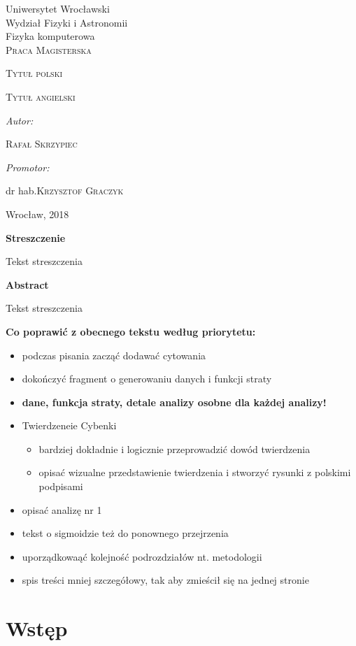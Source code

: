 \documentclass[11pt]{book}
\title{}
\author{Rafał Skrzypiec}
\makeatletter
\theoremstyle{definition}
\newcommand\blankpage{%
	\null
	\thispagestyle{empty}%
	\addtocounter{page}{0}%
	\newpage}
\renewcommand{\maketitle}{\begin{titlepage}
		
		
		
		\begin{center}
			{\Large Uniwersytet Wrocławski\\
				\vspace{0.cm}
				Wydział Fizyki i Astronomii\\
				\vspace{0.2cm}
				Fizyka komputerowa} \\
			\vspace{1.8cm}
			\LARGE \textsc{ Praca Magisterska}		
		\end{center}
		
		\vspace{3.5cm}
		
		\noindent
		
		\begin{center}		
			\huge \textsc{\@ Tytuł polski}
			
			\vspace{0.5cm}
			
			\normalsize \textsc {Tytuł angielski}
			
		\end{center}
		
		
		
		\vspace{3cm}
		
		\begin{flushright}
			
			\begin{minipage}{5.5cm}
				
				\textit{\small Autor:}
				
				\normalsize \textsc{\@ Rafał Skrzypiec} \par
				
			\end{minipage}
			
			\vspace{1cm}
			
			
			\begin{minipage}{5.5cm}
				
				\textit{\small Promotor:}
				
				\hspace{0.2cm}dr hab.\textsc{\@ Krzysztof Graczyk} \par
				
			\end{minipage}
			
		\end{flushright}
		
		
		\vspace*{\stretch{4}}
		
		\begin{center}
			
			Wrocław, 2018
			
		\end{center}
		
	\end{titlepage}%
	
}
\makeatother
\begin{document}

\maketitle
\blankpage


\begin{center}
	{\large 	\textbf{Streszczenie}}

\end{center}
\normalsize 
	Tekst streszczenia

\vspace{2cm}

\begin{center}
	{\large 	\textbf{Abstract}}
\end{center}
\normalsize
	Tekst streszczenia

\vspace{2cm}

\textbf{Co poprawić z obecnego tekstu według priorytetu:}
\begin{itemize}
	\item podczas pisania zacząć dodawać cytowania
	\item dokończyć fragment o generowaniu danych i funkcji straty
	\item \textbf{dane, funkcja straty, detale analizy osobne dla każdej analizy!}
	\item Twierdzeneie Cybenki	
	\begin{itemize}
			\item  bardziej dokładnie i logicznie przeprowadzić dowód twierdzenia
			\item  opisać wizualne przedstawienie twierdzenia i stworzyć rysunki z polskimi podpisami				
	\end{itemize}
	\item opisać analizę nr 1
	\item tekst o sigmoidzie też do ponownego przejrzenia
	\item uporządkowaąć kolejność podrozdziałów nt. metodologii
	\item spis treści mniej szczegółowy, tak aby zmieścił się na jednej stronie
\end{itemize}

\tableofcontents

\chapter{Wstęp}
\end{document}
